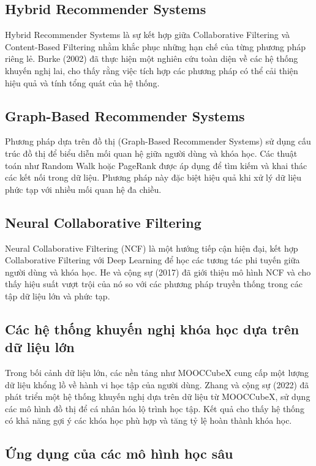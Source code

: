 \subsection{Hybrid Recommender Systems}

Hybrid Recommender Systems là sự kết hợp giữa Collaborative Filtering và Content-Based Filtering nhằm khắc phục những hạn chế của từng phương pháp riêng lẻ. Burke (2002) đã thực hiện một nghiên cứu toàn diện về các hệ thống khuyến nghị lai, cho thấy rằng việc tích hợp các phương pháp có thể cải thiện hiệu quả và tính tổng quát của hệ thống.

\subsection{Graph-Based Recommender Systems}

Phương pháp dựa trên đồ thị (Graph-Based Recommender Systems) sử dụng cấu trúc đồ thị để biểu diễn mối quan hệ giữa người dùng và khóa học. Các thuật toán như Random Walk hoặc PageRank được áp dụng để tìm kiếm và khai thác các kết nối trong dữ liệu. Phương pháp này đặc biệt hiệu quả khi xử lý dữ liệu phức tạp với nhiều mối quan hệ đa chiều.

\subsection{Neural Collaborative Filtering}

Neural Collaborative Filtering (NCF) là một hướng tiếp cận hiện đại, kết hợp Collaborative Filtering với Deep Learning để học các tương tác phi tuyến giữa người dùng và khóa học. He và cộng sự (2017) đã giới thiệu mô hình NCF và cho thấy hiệu suất vượt trội của nó so với các phương pháp truyền thống trong các tập dữ liệu lớn và phức tạp.

\subsection{Các hệ thống khuyến nghị khóa học dựa trên dữ liệu lớn}

Trong bối cảnh dữ liệu lớn, các nền tảng như MOOCCubeX cung cấp một lượng dữ liệu khổng lồ về hành vi học tập của người dùng. Zhang và cộng sự (2022) đã phát triển một hệ thống khuyến nghị dựa trên dữ liệu từ MOOCCubeX, sử dụng các mô hình đồ thị để cá nhân hóa lộ trình học tập. Kết quả cho thấy hệ thống có khả năng gợi ý các khóa học phù hợp và tăng tỷ lệ hoàn thành khóa học.

\subsection{Ứng dụng của các mô hình học sâu}

